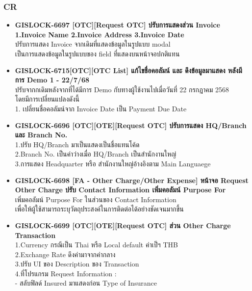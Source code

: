 \subsubsection{CR}
\begin{itemize}
    \setlength\itemsep{1em}
    \item \textbf{{GISLOCK-6697 [OTC][Request OTC] ปรับการแสดงส่วน Invoice 1.Invoice Name 2.Invoice Address 3.Invoice Date}} \\
          ปรับการแสดง Invoice จากเดิมที่แสดงข้อมูลในรูปแบบ modal\\
            เป็นการแสดงข้อมูลในรูปแบบของ field ที่แสดงบนหน้าจอปกติแทน
    \item \textbf{{GISLOCK-6715[OTC][OTC List] แก้ไขชื่อคอลัมน์ และ ดึงข้อมูลมาแสดง หลังมีการ Demo 1 - 22/7/68}} \\
          ปรับจากกเดิมหลังจากที่ได้มีการ Demo กับทางผู้ใช้งานไปเมื่อวันที่ 22 กรกฎาคม 2568 \\
            โดยมีการเปลี่ยนแปลงดังนี้ \\
            1. เปลี่ยนชื่อคอลัมน์จาก Invoice Date เป็น Payment Due Date
    \item \textbf{{GISLOCK-6696 [OTC][OTE][Request OTC] ปรับการแสดง HQ/Branch และ Branch No.}} \\
          1.ปรับ HQ/Branch มาเป็นแสดงเป็นชื่อแทนโค้ด \\
          2.Branch No. เป็นค่าว่างเมื่อ HQ/Branch เป็นสำนักงานใหญ่ \\
          3.การแสดง Headquarter หรือ สำนักงานใหญ่อ้างอิงตาม Main Languaege
    \item \textbf{{GISLOCK-6698 [FA - Other Charge/Other Expense] หน้าจอ Request Other Charge ปรับ Contact Information เพิ่มคอลัมน์ Purpose For}} \\
          เพิ่มคอลัมน์ Purpose For ในส่วนของ Contact Information \\
            เพื่อให้ผู้ใช้สามารถระบุวัตถุประสงค์ในการติดต่อได้อย่างชัดเจนมากขึ้น 
    \item \textbf{{GISLOCK-6699 [OTC][OTE][Request OTC] ส่วน Other Charge Transaction}} \\
          1.Currency กรณีเป็น Thai หรือ Local default ค่าเป็ฯ THB \\
          2.Exchange Rate ดึงค่ามาจากค่ากลาง  \\
          3.ปรับ UI ของ Description ของ Transaction \\
          4.ที่โปรแกรม Request Information :\\
            - สลับฟิลด์ Insured มาแสดงก่อน Type of Insurance \\

\end{itemize}
